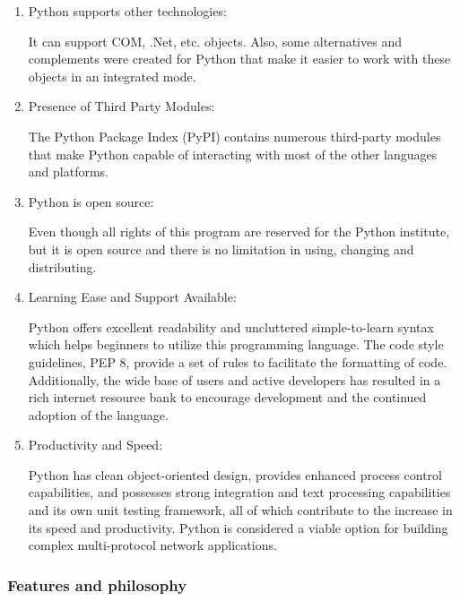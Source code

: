 \begin{enumerate}

  \item Python supports other technologies:

        It can support COM, .Net, etc. objects. Also, some
        alternatives and complements were created for
        Python that make it easier to work with these
        objects in an integrated mode.

  \item Presence of Third Party Modules:

        The Python Package Index (PyPI) contains numerous
        third-party modules that make Python capable of
        interacting with most of the other languages and
        platforms.\cite{amjad16}

  \item Python is open source:

        Even though all rights of this program are reserved
        for the Python institute, but it is open source and
        there is no limitation in using, changing and
        distributing.\cite{amjad17}

  \item Learning Ease and Support Available:

        Python offers excellent readability and uncluttered
        simple-to-learn syntax which helps beginners to
        utilize this programming language. The code style
        guidelines, PEP 8, provide a set of rules to
        facilitate the formatting of code. Additionally,
        the wide base of users and active developers has
        resulted in a rich internet resource bank to
        encourage development and the continued adoption of
        the language.\cite{amjad16}

  \item Productivity and Speed:

        Python has clean object-oriented design, provides
        enhanced process control capabilities, and
        possesses strong integration and text processing
        capabilities and its own unit testing framework,
        all of which contribute to the increase in its
        speed and productivity. Python is considered a
        viable option for building complex multi-protocol
        network applications.\cite{amjad16}

\end{enumerate}

\subsubsection{Features and philosophy}

